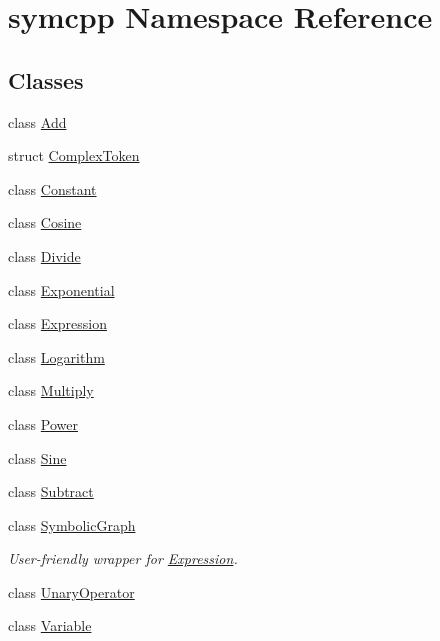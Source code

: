 \hypertarget{namespacesymcpp}{}\section{symcpp Namespace Reference}
\label{namespacesymcpp}
\subsection*{Classes}
\begin{DoxyCompactItemize}
\item 
class \mbox{\hyperlink{classsymcpp_1_1Add}{Add}}
\item 
struct \mbox{\hyperlink{structsymcpp_1_1ComplexToken}{Complex\+Token}}
\item 
class \mbox{\hyperlink{classsymcpp_1_1Constant}{Constant}}
\item 
class \mbox{\hyperlink{classsymcpp_1_1Cosine}{Cosine}}
\item 
class \mbox{\hyperlink{classsymcpp_1_1Divide}{Divide}}
\item 
class \mbox{\hyperlink{classsymcpp_1_1Exponential}{Exponential}}
\item 
class \mbox{\hyperlink{classsymcpp_1_1Expression}{Expression}}
\item 
class \mbox{\hyperlink{classsymcpp_1_1Logarithm}{Logarithm}}
\item 
class \mbox{\hyperlink{classsymcpp_1_1Multiply}{Multiply}}
\item 
class \mbox{\hyperlink{classsymcpp_1_1Power}{Power}}
\item 
class \mbox{\hyperlink{classsymcpp_1_1Sine}{Sine}}
\item 
class \mbox{\hyperlink{classsymcpp_1_1Subtract}{Subtract}}
\item 
class \mbox{\hyperlink{classsymcpp_1_1SymbolicGraph}{Symbolic\+Graph}}
\begin{DoxyCompactList}\small\item\em User-\/friendly wrapper for \mbox{\hyperlink{classsymcpp_1_1Expression}{Expression}}. \end{DoxyCompactList}\item 
class \mbox{\hyperlink{classsymcpp_1_1UnaryOperator}{Unary\+Operator}}
\item 
class \mbox{\hyperlink{classsymcpp_1_1Variable}{Variable}}
\end{DoxyCompactItemize}
